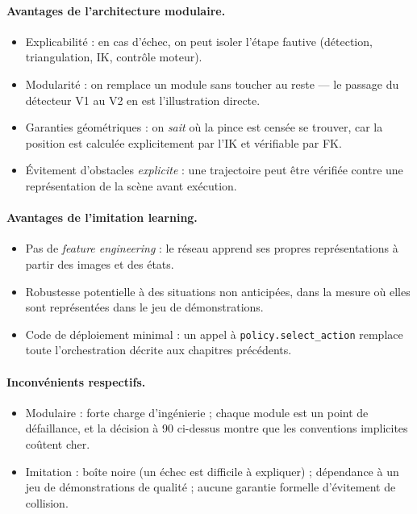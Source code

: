 \paragraph{Avantages de l'architecture modulaire.}
\begin{itemize}
  \item Explicabilité : en cas d'échec, on peut isoler l'étape fautive (détection,
        triangulation, IK, contrôle moteur).
  \item Modularité : on remplace un module sans toucher au reste --- le passage du
        détecteur V1 au V2 en est l'illustration directe.
  \item Garanties géométriques : on \emph{sait} où la pince est censée se trouver,
        car la position est calculée explicitement par l'IK et vérifiable par FK.
  \item Évitement d'obstacles \emph{explicite} : une trajectoire peut être vérifiée
        contre une représentation de la scène avant exécution.
\end{itemize}

\paragraph{Avantages de l'imitation learning.}
\begin{itemize}
  \item Pas de \emph{feature engineering} : le réseau apprend ses propres
        représentations à partir des images et des états.
  \item Robustesse potentielle à des situations non anticipées, dans la mesure où
        elles sont représentées dans le jeu de démonstrations.
  \item Code de déploiement minimal : un appel à \texttt{policy.select\_action}
        remplace toute l'orchestration décrite aux chapitres précédents.
\end{itemize}

\paragraph{Inconvénients respectifs.}
\begin{itemize}
  \item Modulaire : forte charge d'ingénierie ; chaque module est un point de
        défaillance, et la décision à 90\textdegree{} ci-dessus montre que les
        conventions implicites coûtent cher.
  \item Imitation : boîte noire (un échec est difficile à expliquer) ; dépendance
        à un jeu de démonstrations de qualité ; aucune garantie formelle
        d'évitement de collision.
\end{itemize}

